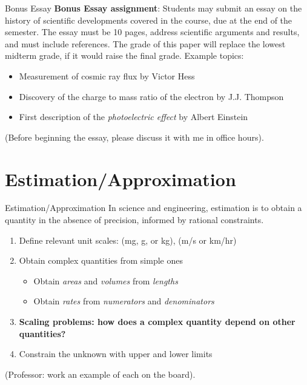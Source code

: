 \documentclass{beamer}
\begin{document}
\begin{frame}{Bonus Essay}
\small
\textbf{\alert{Bonus Essay assignment}}: Students may submit an essay on the history of scientific developments covered in the course, due at the end of the semester. The essay must be 10 pages, address scientific arguments and results, and must include references. The grade of this paper will replace the lowest midterm grade, if it would raise the final grade.  Example topics:
\begin{itemize}
\item Measurement of cosmic ray flux by Victor Hess
\item Discovery of the charge to mass ratio of the electron by J.J. Thompson
\item First description of the \textit{photoelectric effect} by Albert Einstein
\end{itemize}
(Before beginning the essay, please discuss it with me in office hours).
\end{frame}

\section{Estimation/Approximation}

\begin{frame}{Estimation/Approximation}
In science and engineering, \alert{estimation} is to obtain a quantity in the absence of precision, informed by rational constraints.
\begin{enumerate}
\item Define relevant \alert{unit scales}: (mg, g, or kg), (m/s or km/hr)
\item Obtain \alert{complex quantities} from simple ones
\begin{itemize}
\item Obtain \textit{areas} and \textit{volumes} from \textit{lengths}
\item Obtain \textit{rates} from \textit{numerators} and \textit{denominators}
\end{itemize}
\item \textbf{Scaling problems: how does a complex quantity depend on other quantities?}
\item Constrain the unknown with \alert{upper} and \alert{lower} limits
\end{enumerate}
(Professor: work an example of each on the board).
\end{frame}
\end{document}
